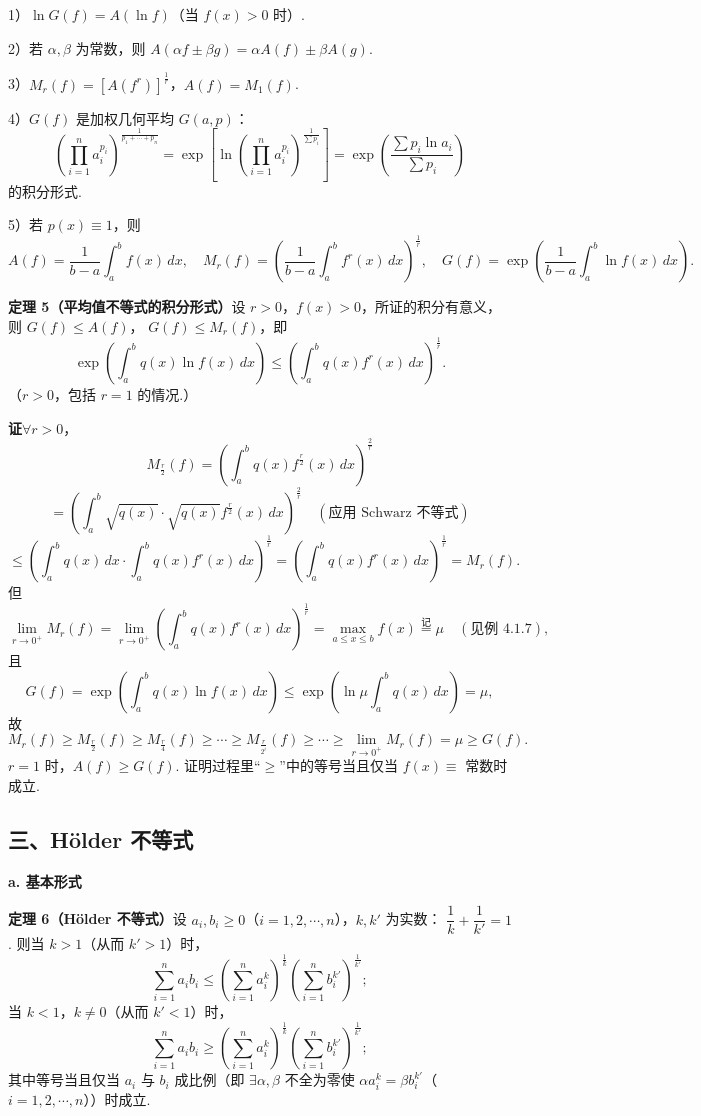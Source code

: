 \documentclass[UTF8,12pt,a4paper,fontset=fandol]{ctexart}
\begin{document}
1）$\ln G(f)=A(\ln f)$（当 $f(x)>0$ 时）.

2）若 $\alpha,\beta$ 为常数，则 $A(\alpha f\pm\beta g)=\alpha A(f)\pm\beta A(g)$.

3）$M_r(f)=[A(f^r)]^{\frac1r}$，$A(f)=M_1(f)$.

4）$G(f)$ 是加权几何平均 $G(a,p)$：
\[
\left(\prod_{i=1}^n a_i^{p_i}\right)^{\frac1{p_1+\cdots+p_n}}
=\exp\left[\ln\left(\prod_{i=1}^n a_i^{p_i}\right)^{\frac1{\sum p_i}}\right]
=\exp\left(\frac{\sum p_i\ln a_i}{\sum p_i}\right)
\]
的积分形式.

5）若 $p(x)\equiv1$，则
\[
A(f)=\frac1{b-a}\int_a^b f(x)\,dx,\quad
M_r(f)=\left(\frac1{b-a}\int_a^b f^r(x)\,dx\right)^{\frac1r},\quad
G(f)=\exp\left(\frac1{b-a}\int_a^b\ln f(x)\,dx\right).
\]

\noindent\textbf{定理 5（平均值不等式的积分形式）}\quad 设 $r>0$，$f(x)>0$，所证的积分有意义，则 $G(f)\le A(f)$，
$G(f)\le M_r(f)$，即
\[
\exp\left(\int_a^b q(x)\ln f(x)\,dx\right)
\le\left(\int_a^b q(x)f^r(x)\,dx\right)^{\frac1r}.
\]
（$r>0$，包括 $r=1$ 的情况.）

\noindent\textbf{证}\quad $\forall r>0$，
\[
M_{\frac r2}(f)=\left(\int_a^b q(x)f^{\frac r2}(x)\,dx\right)^{\frac2r}
\]
\[
=\left(\int_a^b\sqrt{q(x)}\cdot\sqrt{q(x)}f^{\frac r2}(x)\,dx\right)^{\frac2r}\quad(\text{应用 Schwarz 不等式})
\]
\[
\le\left(\int_a^b q(x)\,dx\cdot\int_a^b q(x)f^r(x)\,dx\right)^{\frac1r}
=\left(\int_a^b q(x)f^r(x)\,dx\right)^{\frac1r}=M_r(f).
\]
但
\[
\lim_{r\to0^+}M_r(f)
=\lim_{r\to0^+}\left(\int_a^b q(x)f^r(x)\,dx\right)^{\frac1r}
=\max_{a\le x\le b}f(x)\stackrel{\text{记}}{=}\mu\quad(\text{见例 4.1.7}),
\]
且
\[
G(f)=\exp\left(\int_a^b q(x)\ln f(x)\,dx\right)
\le \exp\left(\ln\mu\int_a^b q(x)\,dx\right)=\mu,
\]
故
\[
M_r(f)\ge M_{\frac r2}(f)\ge M_{\frac r4}(f)\ge\cdots\ge
M_{\frac r{2^i}}(f)\ge\cdots\ge\lim_{r\to0^+}M_r(f)=\mu\ge G(f).
\]
$r=1$ 时，$A(f)\ge G(f)$. 证明过程里“$\ge$”中的等号当且仅当 $f(x)\equiv$ 常数时成立.

\subsection*{三、Hölder 不等式}

\noindent\textbf{a. 基本形式}

\noindent\textbf{定理 6（Hölder 不等式）}\quad 设 $a_i,b_i\ge0$（$i=1,2,\cdots,n$），$k,k'$ 为实数：
$\dfrac1k+\dfrac1{k'}=1$. 则当 $k>1$（从而 $k'>1$）时，
\[
\sum_{i=1}^n a_i b_i
\le \left(\sum_{i=1}^n a_i^k\right)^{\frac1k}
\left(\sum_{i=1}^n b_i^{k'}\right)^{\frac1{k'}}; \tag{1}
\]
当 $k<1$，$k\ne0$（从而 $k'<1$）时，
\[
\sum_{i=1}^n a_i b_i
\ge \left(\sum_{i=1}^n a_i^k\right)^{\frac1k}
\left(\sum_{i=1}^n b_i^{k'}\right)^{\frac1{k'}}; \tag{2}
\]
其中等号当且仅当 $a_i$ 与 $b_i$ 成比例（即 $\exists\alpha,\beta$ 不全为零使
$\alpha a_i^k=\beta b_i^{k'}$（$i=1,2,\cdots,n$））时成立.
\end{document}
